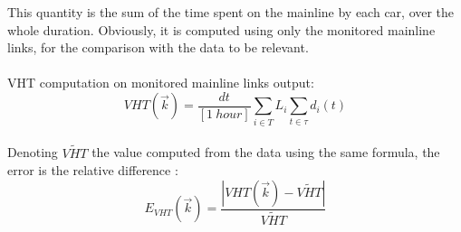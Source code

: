 This quantity is the sum of the time spent on the mainline by each car, over the whole duration.
Obviously, it is computed using only the monitored mainline links, for the comparison with the data to be relevant.\\
\\
VHT computation on monitored mainline links output:
\begin{equation*}
	 VHT(\vec{k})=\frac{dt}{[1\ hour]}\sum_{i\in{T}}L_{i}\sum_{t\in \tau}d_{i}(t)
\end{equation*}
\\
Denoting $\widetilde{VHT}$ the value computed from the data using the same formula, the error is the relative difference :
\begin{equation*}
	E_{VHT}(\vec{k})=\frac{|VHT(\vec{k})-\widetilde{VHT}|}{\widetilde{VHT}}
\end{equation*}
~\\